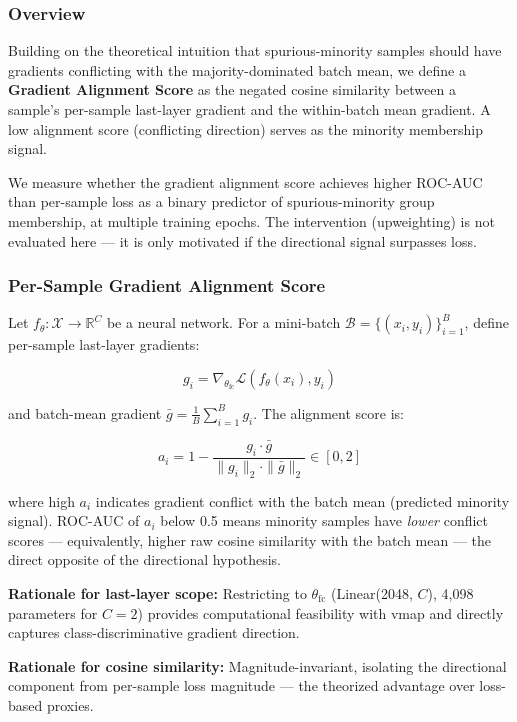 
\subsubsection{Overview}

Building on the theoretical intuition that spurious-minority samples should have gradients conflicting with the majority-dominated batch mean, we define a \textbf{Gradient Alignment Score} as the negated cosine similarity between a sample's per-sample last-layer gradient and the within-batch mean gradient. A low alignment score (conflicting direction) serves as the minority membership signal.

We measure whether the gradient alignment score achieves higher ROC-AUC than per-sample loss as a binary predictor of spurious-minority group membership, at multiple training epochs. The intervention (upweighting) is not evaluated here --- it is only motivated if the directional signal surpasses loss.

\subsubsection{Per-Sample Gradient Alignment Score}

Let $f_\theta: \mathcal{X} \to \mathbb{R}^C$ be a neural network. For a mini-batch $\mathcal{B} = \{(x_i, y_i)\}_{i=1}^{B}$, define per-sample last-layer gradients:

$$g_i = \nabla_{\theta_{\text{fc}}} \mathcal{L}(f_\theta(x_i), y_i)$$

and batch-mean gradient $\bar{g} = \frac{1}{B} \sum_{i=1}^{B} g_i$. The alignment score is:

$$a_i = 1 - \frac{g_i \cdot \bar{g}}{\|g_i\|_2 \cdot \|\bar{g}\|_2} \in [0, 2]$$

where high $a_i$ indicates gradient conflict with the batch mean (predicted minority signal). ROC-AUC of $a_i$ below 0.5 means minority samples have \textit{lower} conflict scores --- equivalently, higher raw cosine similarity with the batch mean --- the direct opposite of the directional hypothesis.

\textbf{Rationale for last-layer scope:} Restricting to $\theta_{\text{fc}}$ (Linear(2048, $C$), 4,098 parameters for $C=2$) provides computational feasibility with vmap and directly captures class-discriminative gradient direction.

\textbf{Rationale for cosine similarity:} Magnitude-invariant, isolating the directional component from per-sample loss magnitude --- the theorized advantage over loss-based proxies.

